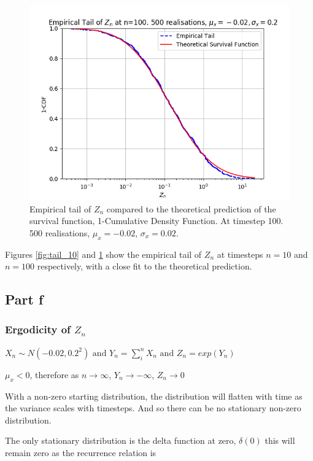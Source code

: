 \documentclass{article}
\begin{document}
\begin{figure}[H]
\includegraphics[scale=0.8]{empirical_tail_100_a.png} 

\caption{Empirical tail of $Z_n$ compared to the theoretical prediction of the survival function, 1-Cumulative Density Function. At timestep 100. 500 realisations, $\mu_x=-0.02$, $\sigma_x=0.02$.}
\label{fig:tail_100}
\end{figure}

Figures \ref{fig:tail_10} and \ref{fig:tail_100} show the empirical tail of $Z_n$ at timesteps $n=10$ and $n=100$ respectively, with a close fit to the theoretical prediction. 

\subsection{Part f}

\subsubsection{Ergodicity of $Z_n$}

$X_n \sim N(-0.02, 0.2^2) \text{ and } Y_n = \sum_i^nX_n \text{ and } Z_n = exp(Y_n)$

$\mu_x < 0$, therefore as $n \to \infty$,  $Y_n \to -\infty$, $Z_n \to 0$

With a non-zero starting distribution, the distribution will flatten with time as the variance scales with timesteps. And so there can be no stationary non-zero distribution. 

The only stationary distribution is the delta function at zero, $\delta(0)$ this will remain zero as the recurrence relation is
\end{document}
